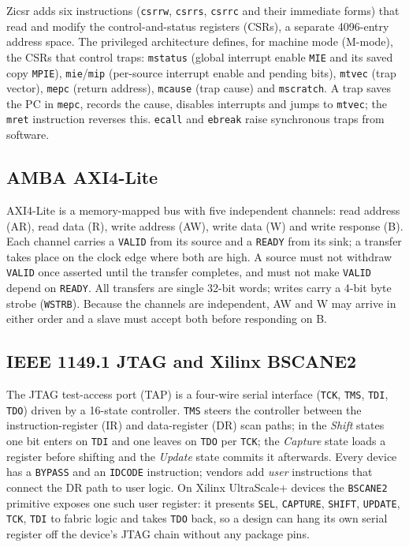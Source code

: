 \documentclass[journal,10pt]{IEEEtran}
\newcommand{\reg}[1]{\texttt{#1}}
\begin{document}
Zicsr adds six instructions (\reg{csrrw}, \reg{csrrs}, \reg{csrrc} and their
immediate forms) that read and modify the control-and-status registers
(CSRs), a separate 4096-entry address space. The privileged architecture
\cite{riscv-priv} defines, for machine mode (M-mode), the CSRs that control
traps: \reg{mstatus} (global interrupt enable \reg{MIE} and its saved copy
\reg{MPIE}), \reg{mie}/\reg{mip} (per-source interrupt enable and pending
bits), \reg{mtvec} (trap vector), \reg{mepc} (return address),
\reg{mcause} (trap cause) and \reg{mscratch}. A trap saves the PC in
\reg{mepc}, records the cause, disables interrupts and jumps to \reg{mtvec};
the \reg{mret} instruction reverses this. \reg{ecall} and \reg{ebreak} raise
synchronous traps from software.

\subsection{AMBA AXI4-Lite}
AXI4-Lite \cite{axi} is a memory-mapped bus with five independent channels:
read address (AR), read data (R), write address (AW), write data (W) and
write response (B). Each channel carries a \reg{VALID} from its source and a
\reg{READY} from its sink; a transfer takes place on the clock edge where
both are high. A source must not withdraw \reg{VALID} once asserted until the
transfer completes, and must not make \reg{VALID} depend on \reg{READY}. All
transfers are single 32-bit words; writes carry a 4-bit byte strobe
(\reg{WSTRB}). Because the channels are independent, AW and W may arrive in
either order and a slave must accept both before responding on B.

\subsection{IEEE 1149.1 JTAG and Xilinx BSCANE2}
The JTAG test-access port (TAP) \cite{ieee1149} is a four-wire serial
interface (\reg{TCK}, \reg{TMS}, \reg{TDI}, \reg{TDO}) driven by a 16-state
controller. \reg{TMS} steers the controller between the instruction-register
(IR) and data-register (DR) scan paths; in the \emph{Shift} states one bit
enters on \reg{TDI} and one leaves on \reg{TDO} per \reg{TCK}; the
\emph{Capture} state loads a register before shifting and the \emph{Update}
state commits it afterwards. Every device has a \reg{BYPASS} and an
\reg{IDCODE} instruction; vendors add \emph{user} instructions that connect
the DR path to user logic. On Xilinx UltraScale+ devices the \reg{BSCANE2}
primitive \cite{ug974} exposes one such user register: it presents
\reg{SEL}, \reg{CAPTURE}, \reg{SHIFT}, \reg{UPDATE}, \reg{TCK}, \reg{TDI} to
fabric logic and takes \reg{TDO} back, so a design can hang its own serial
register off the device's JTAG chain without any package pins.
\end{document}
